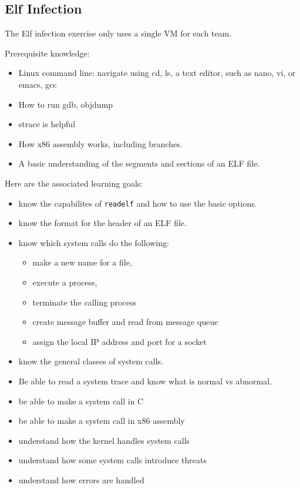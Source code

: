 \documentclass[11pt]{report}
\begin{document}
\subsection{Elf Infection}
The Elf infection exercise only uses a single VM for each team.  

Prerequisite knowledge:
\begin{itemize}
   \item Linux command line: navigate using cd, ls, a text editor, such as nano, vi, or emacs, gcc
   \item How to run gdb, objdump
   \item strace is helpful
   \item How x86 assembly works, including branches.
   \item A basic understanding of the segments and sections of an ELF file.
\end{itemize}

Here are the associated learning goals:
\begin{itemize}
  \item know the capabilites of {\tt readelf} and how to use the basic options.
  \item know the format for the header of an ELF file.
  \item know which system calls do the following: 
    \begin{itemize} 
      \item make a new name for a file, 
      \item execute a process, 
      \item terminate the calling process
      \item create message buffer and read from message queue
      \item assign the local IP address and port for a socket
    \end{itemize}
  \item know the general classes of system calls.
  \item Be able to read a system trace and know what is normal vs abnormal.
  \item be able to make a system call in C
  \item be able to make a system call in x86 assembly
  \item understand how the kernel handles system calls
  \item understand how some system calls introduce threats
  \item understand how errors are handled
\end{itemize}
\end{document}
